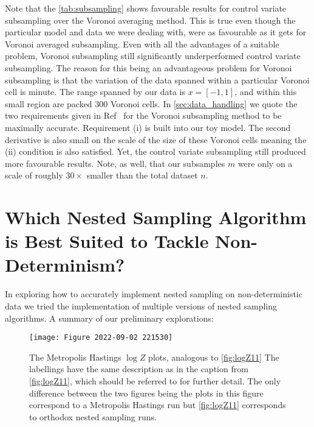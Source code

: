 Note that the \cref{tab:subsampling} shows favourable results for control variate subsampling over the Voronoi averaging method. This is true even though the particular model and data we were dealing with, were as favourable as it gets for Voronoi averaged subsampling. Even with all the advantages of a suitable problem, Voronoi subsampling still significantly underperformed control variate subsampling. The reason for this being an advantageous problem for Voronoi subsampling is that the variation of the data spanned within a particular Voronoi cell is minute. The range spanned by our data is $x=[-1,1]$, and within this small region are packed $300$ Voronoi cells. In \cref{sec:data_handling} we quote the two requirements given in Ref~\cite{Mihaylov_2020} for the Voronoi subsampling method to be maximally accurate. Requirement (i) is built into our toy model. The second derivative is also small on the scale of the size of these Voronoi cells meaning the (ii) condition is also satisfied. Yet, the control variate subsampling still produced more favourable results. Note, as well, that our subsamples $m$ were only on a scale of roughly $30 \times$ smaller than the total dataset $n$. 





\section{Which Nested Sampling Algorithm is Best Suited to Tackle Non-Determinism?}\label{sec:nondet}

In exploring how to accurately implement nested sampling on non-deterministic data we tried the implementation of multiple versions of nested sampling algorithms. A summary of our preliminary explorations:


\begin{figure} 
\centering    
\texttt{[image: Figure 2022-09-02 221530]}
\caption[Orthodox]{The Metropolis Hastings $\log Z$ plots, analogous to \cref{fig:logZ11} The labellings have the same description as in the caption from \cref{fig:logZ11}, which should be referred to for further detail. The only difference between the two figures being the plots in this figure correspond to a Metropolis Hastings run but \cref{fig:logZ11} corresponds to orthodox nested sampling runs.}
\label{fig:logZ2}
\end{figure}

